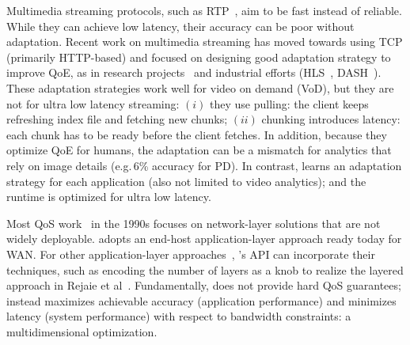  Multimedia streaming protocols, such as
RTP~\cite{schulzrinne2006rtp}, aim to be fast instead of reliable. While they
can achieve low latency, their accuracy can be poor without adaptation.  Recent
work on multimedia streaming has moved towards using TCP (primarily HTTP-based)
and focused on designing good adaptation strategy to improve QoE, as in research
projects~\cite{mao2017neural, sun2016cs2p, yin2015control} and industrial
efforts (HLS~\cite{pantos2016http}, DASH~\cite{michalos2012dynamic,
  sodagar2011mpeg}). These adaptation strategies work well for video on demand
(VoD), but they are not for ultra low latency streaming: $(i)$ they use pulling:
the client keeps refreshing index file and fetching new chunks; $(ii)$ chunking
introduces latency: each chunk has to be ready before the client fetches.  In
addition, because they optimize QoE for humans, the adaptation can be a mismatch
for analytics that rely on image details (e.g.\,6\% accuracy for PD). In
contrast, \sysname{} learns an adaptation strategy for each application (also
not limited to video analytics); and the runtime is optimized for ultra low
latency.

 Most QoS work~\cite{ferrari1990scheme, shenker1994integrated,
  shenker1995fundamental} in the 1990s focuses on network-layer solutions that
are not widely deployable. \sysname{} adopts an end-host application-layer
approach ready today for WAN. For other application-layer
approaches~\cite{vandalore2001survey}, \sysname{}'s API can incorporate their
techniques, such as encoding the number of layers as a knob to realize the
layered approach in Rejaie et al~\cite{rejaie2000layered}. Fundamentally,
\sysname{} does not provide hard QoS guarantees; instead \sysname{} maximizes
achievable accuracy (application performance) and minimizes latency (system
performance) with respect to bandwidth constraints: a multidimensional
optimization.




